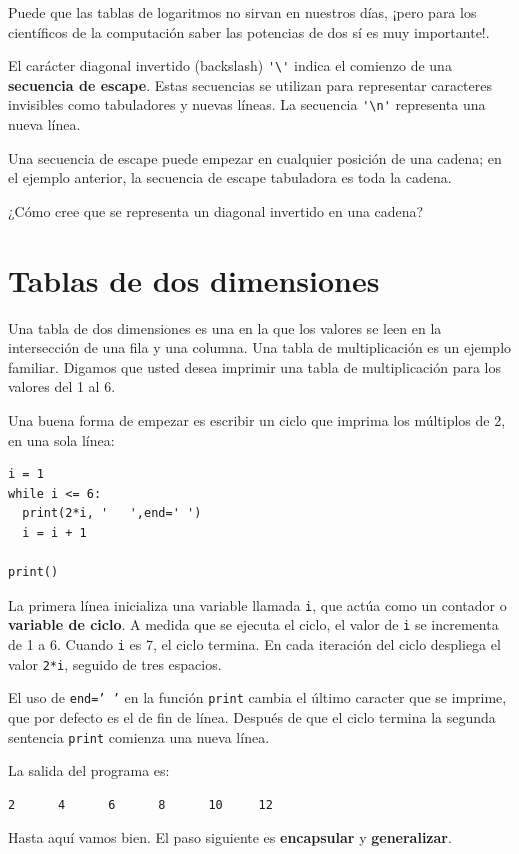 Puede que las tablas de logaritmos no sirvan en nuestros días, ¡pero
para los científicos de la computación saber las potencias de dos
sí es muy importante!.


El carácter diagonal invertido (backslash) \verb+'\'+ indica el comienzo
de una \textbf{secuencia de escape}. Estas secuencias se utilizan
para representar caracteres invisibles como tabuladores y nuevas líneas.
La secuencia \verb+'\n'+ representa una nueva línea.

Una secuencia de escape puede empezar en cualquier posición de una
cadena; en el ejemplo anterior, la secuencia de escape tabuladora
es toda la cadena.

¿Cómo cree que se representa un diagonal invertido en una cadena?

\section{Tablas de dos dimensiones}


Una tabla de dos dimensiones es una en la que los valores se leen
en la intersección de una fila y una columna. Una tabla de multiplicación
es un ejemplo familiar. Digamos que usted desea imprimir una tabla
de multiplicación para los valores del 1 al 6.

Una buena forma de empezar es escribir un ciclo que imprima los múltiplos
de 2, en una sola línea:
\begin{verbatim}
i = 1
while i <= 6:
  print(2*i, '   ',end=' ')
  i = i + 1

print()
\end{verbatim}

La primera línea inicializa una variable llamada \texttt{i}, que actúa
como un contador o \textbf{variable de ciclo}. A medida que se ejecuta
el ciclo, el valor de \texttt{i} se incrementa de 1 a 6. Cuando \texttt{i}
es 7, el ciclo termina. En cada iteración del ciclo despliega el valor
\texttt{2{*}i}, seguido de tres espacios.

El uso de \texttt{end=' '} en la función \texttt{print} cambia el
último caracter que se imprime, que por defecto es el de fin de línea.
Después de que el ciclo termina la segunda sentencia \texttt{print}
comienza una nueva línea.

La salida del programa es:
\begin{verbatim}
2      4      6      8      10     12
\end{verbatim}
Hasta aquí vamos bien. El paso siguiente es \textbf{encapsular} y
\textbf{generalizar}.

